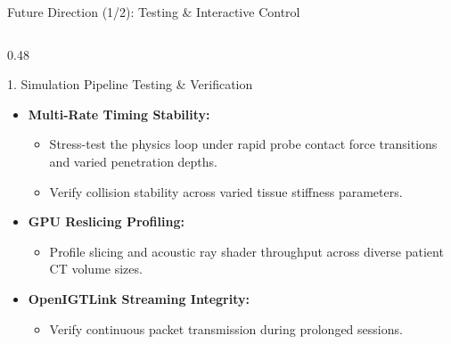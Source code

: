 \documentclass{if-beamer}
\begin{document}
\begin{frame}{Future Direction (1/2): Testing \& Interactive Control}
    \begin{columns}[T]
        \begin{column}{0.48\textwidth}
            \begin{block}{1. Simulation Pipeline Testing \& Verification}
                \begin{itemize}\itemsep=3pt
                    \item \textbf{Multi-Rate Timing Stability:}
                    \begin{itemize}\itemsep=1pt
                        \item Stress-test the physics loop under rapid probe contact force transitions and varied penetration depths.
                        \item Verify collision stability across varied tissue stiffness parameters.
                    \end{itemize}
                    \item \textbf{GPU Reslicing Profiling:}
                    \begin{itemize}\itemsep=1pt
                        \item Profile slicing and acoustic ray shader throughput across diverse patient CT volume sizes.
                    \end{itemize}
                    \item \textbf{OpenIGTLink Streaming Integrity:}
                    \begin{itemize}\itemsep=1pt
                        \item Verify continuous packet transmission during prolonged sessions.
                    \end{itemize}
                \end{itemize}
            \end{block}
        \end{column}


\end{columns}
\end{frame}
\end{document}
